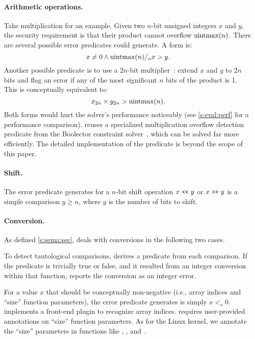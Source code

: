 \paragraph{Arithmetic operations.}
Take multiplication for an example.  Given two $n$-bit unsigned
integers $x$ and $y$, the security requirement is that their product
cannot overflow $\operatorname{uintmax}(n)$.  There are several possible error
predicates \sys could generate.
A \naive form is:
\begin{equation*}
x \neq 0 \land \operatorname{uintmax}(n) /_u x > y.
\end{equation*}
Another possible predicate is to use a $2n$-bit
multiplier~\cite{molnar:catchconv}: extend $x$ and $y$ to $2n$ bits
and flag an error if any of the most significant $n$ bits of the
product is 1.  This is conceptually equivalent to:
\begin{equation*}
x_{2n} \times y_{2n} > \operatorname{uintmax}(n).
\end{equation*}
Both forms would hurt the solver's performance noticeably
(see \autoref{s:eval:perf} for a performance comparison).
%
\sys reuses a specialized multiplication overflow detection predicate
from the Boolector constraint
solver~\cite[\chapterautorefname~3.5]{brummayer:phd}, which can be
solved far more efficiently.  The detailed implementation of the
predicate is beyond the scope of this paper.

\paragraph{Shift.}
The error predicate \sys generates for a $n$-bit shift operation
$x \shl y$ or $x \shr y$ is a simple comparison $y \geq n$, where
$y$ is the number of bits to shift.

\paragraph{Conversion.}
As defined \autoref{s:sema:sec}, \sys deals with conversions
in the following two cases.

To detect tautological comparisons, \sys derives a predicate from
each comparison.  If the predicate is trivially true or false,
and it resulted from an integer conversion within that function, \sys
reports the conversion as an integer error.

For a value $x$ that should be conceptually non-negative (i.e.,
array indices and ``size'' function parameters), the error predicate
\sys generates is simply $x <_s 0$.
\sys implements a front-end plugin to recognize array indices.  \sys requires
user-provided annotations on ``size'' function parameters.  As for
the Linux kernel, we annotate the ``size'' parameters in functions like ,
, and .


